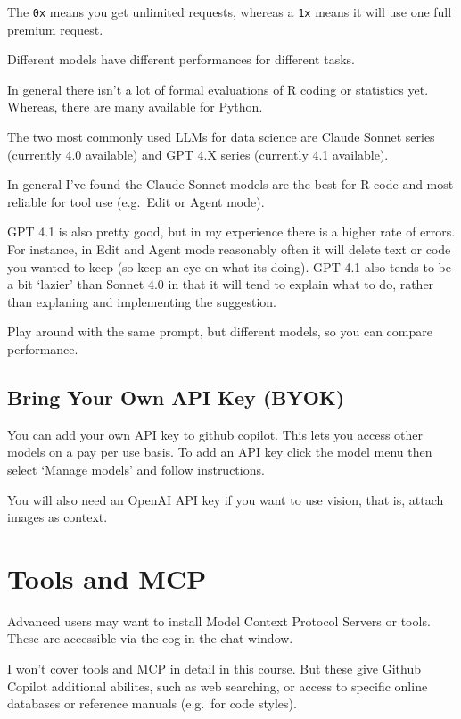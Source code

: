 \documentclass[
  letterpaper,
  DIV=11,
  numbers=noendperiod]{scrreprt}
\begin{document}
The \texttt{0x} means you get unlimited requests, whereas a \texttt{1x}
means it will use one full premium request.

Different models have different performances for different tasks.

In general there isn't a lot of formal evaluations of R coding or
statistics yet. Whereas, there are many available for Python.

The two most commonly used LLMs for data science are Claude Sonnet
series (currently 4.0 available) and GPT 4.X series (currently 4.1
available).

In general I've found the Claude Sonnet models are the best for R code
and most reliable for tool use (e.g.~Edit or Agent mode).

GPT 4.1 is also pretty good, but in my experience there is a higher rate
of errors. For instance, in Edit and Agent mode reasonably often it will
delete text or code you wanted to keep (so keep an eye on what its
doing). GPT 4.1 also tends to be a bit `lazier' than Sonnet 4.0 in that
it will tend to explain what to do, rather than explaning and
implementing the suggestion.

Play around with the same prompt, but different models, so you can
compare performance.

\subsection{Bring Your Own API Key
(BYOK)}\label{bring-your-own-api-key-byok}

You can add your own API key to github copilot. This lets you access
other models on a pay per use basis. To add an API key click the model
menu then select `Manage models' and follow instructions.

You will also need an OpenAI API key if you want to use vision, that is,
attach images as context.

\section{Tools and MCP}\label{tools-and-mcp}

Advanced users may want to install Model Context Protocol Servers or
tools. These are accessible via the cog in the chat window.

I won't cover tools and MCP in detail in this course. But these give
Github Copilot additional abilites, such as web searching, or access to
specific online databases or reference manuals (e.g.~for code styles).
\end{document}
